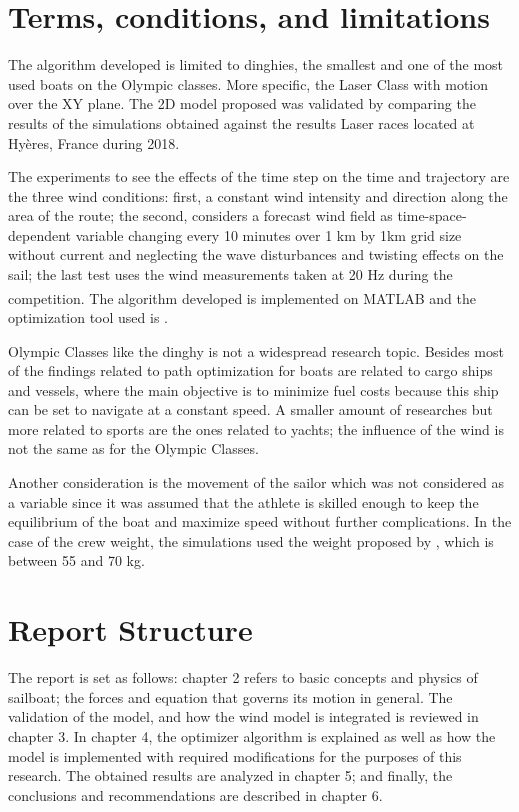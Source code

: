  \section{Terms, conditions, and limitations}

The algorithm developed is limited to dinghies, the smallest and one of the most used boats on the Olympic classes. More specific, the Laser Class with motion over the XY plane. The 2D model proposed was validated by comparing the results of the simulations obtained against the results Laser races located at Hyères, France during 2018.\par \noindent The experiments to see the effects of the time step on the time and trajectory are the three wind conditions: first, a constant wind intensity and direction along the area of the route; the second, considers a forecast wind field as time-space-dependent variable changing every 10 minutes over 1 km by 1km grid size without current and neglecting the wave disturbances and twisting effects on the sail; the last test %
uses the wind measurements taken at 20 Hz during the competition. The algorithm developed is implemented on MATLAB\textsuperscript{\textregistered} and the optimization tool used is \cite{MatlabOTB}.\par 

Olympic Classes like the dinghy is not a widespread research topic. Besides most of the findings related to path optimization for boats are related to cargo ships and vessels, where the main objective is to minimize fuel costs because this ship can be set to navigate at a constant speed. A smaller amount of researches but more related to sports are the ones related to yachts; the influence of the wind is not the same as for the Olympic Classes. \par \noindent 
Another consideration is the movement of the sailor which was not considered as a variable since it was assumed that the athlete is skilled enough to keep the equilibrium of the boat and maximize speed without further complications. In the case of the crew weight, the simulations used the weight proposed by \cite{laser_opt}, which is between	55 and 70 kg.\par 

 \section{Report Structure}
The report is set as follows: chapter 2 refers to basic concepts and physics of sailboat; the forces and equation that governs its motion in general. The validation of the model, and how the wind model is integrated is reviewed in chapter 3. In chapter 4, the optimizer algorithm is explained as well as how the model is implemented with required modifications for the purposes of this research. The obtained results are analyzed in chapter 5; and finally, the conclusions and recommendations are described in chapter 6.\par 

